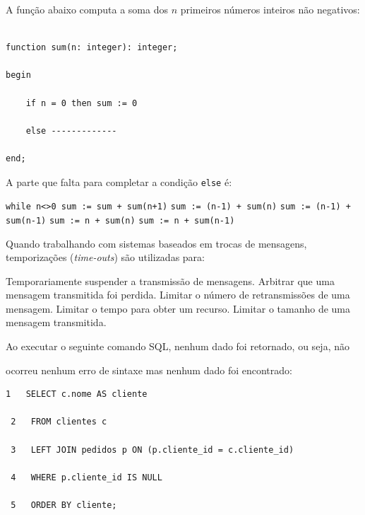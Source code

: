 \documentclass[12pt, addpoints]{exam}
\begin{document}
\begin{questions}
\question

A função abaixo computa a soma dos \( n \) primeiros números inteiros não negativos:



\begin{verbatim}

function sum(n: integer): integer;

begin

    if n = 0 then sum := 0

    else -------------

end;

\end{verbatim}



A parte que falta para completar a condição \texttt{else} é:
\begin{choices}
\choice \texttt{while n<>0 sum := sum + sum(n+1)}
\choice \texttt{sum := (n-1) + sum(n)}
\choice \texttt{sum := (n-1) + sum(n-1)}
\choice \texttt{sum := n + sum(n)}
\choice \texttt{sum := n + sum(n-1)}
\end{choices}

\question

Quando trabalhando com sistemas baseados em trocas de mensagens, temporizações (\textit{time-outs}) são utilizadas para:


\begin{choices}
\choice Temporariamente suspender a transmissão de mensagens.
\choice Arbitrar que uma mensagem transmitida foi perdida.
\choice Limitar o número de retransmissões de uma mensagem.
\choice Limitar o tempo para obter um recurso.
\choice Limitar o tamanho de uma mensagem transmitida.
\end{choices}

\question

Ao executar o seguinte comando SQL, nenhum dado foi retornado, ou seja, não

ocorreu nenhum erro de sintaxe mas nenhum dado foi encontrado:

\begin{tcolorbox}

 \begin{verbatim}1   SELECT c.nome AS cliente

 2   FROM clientes c

 3   LEFT JOIN pedidos p ON (p.cliente_id = c.cliente_id)

 4   WHERE p.cliente_id IS NULL

 5   ORDER BY cliente;


\end{verbatim}
\end{tcolorbox}
\end{questions}
\end{document}
